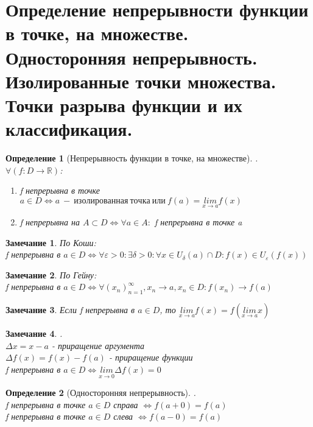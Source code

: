 \documentclass[11pt,a4paper,titlepage]{article}
\newtheorem*{definition}{Определение}
\newtheorem*{remark}{Замечание}
\renewcommand{\lim}[2]{\underset{#1 \rightarrow #2}{lim}}
\renewcommand{\iff}{\Leftrightarrow}
\renewcommand{\epsilon}{\varepsilon}
\newcommand{\R}{\mathbb{R}}
\begin{document}
    \section{Определение непрерывности функции в точке, на множестве. Односторонняя непрерывность. Изолированные точки множества. Точки разрыва функции и их классификация.}

    \begin{definition}[Непрерывность функции в точке, на множестве]
        .\\
        $\forall (f: D \to \R)$:
        \begin{enumerate}
            \item f непрерывна в точке $a \in D \iff a\ -\ изолированная\ точка\ или\ f(a) = \lim{x}{a}f(x)$
            \item f непрерывна на $A \subset D \iff \forall a\in A:$ f непрерывна в точке a
        \end{enumerate}
    \end{definition}

    \begin{remark}
        По Коши:\\
        f непрерывна в $a \in D \iff \forall \epsilon > 0: \exists \delta > 0: \forall x \in U_\delta(a) \cap D: f(x) \in U_\epsilon(f(x))$
    \end{remark}

    \begin{remark}
        По Гейну:\\
        f непрерывна в $a \in D \iff \forall (x_n)_{n=1}^\infty, x_n \to a, x_n \in D: f(x_n) \to f(a)$
    \end{remark}

    \begin{remark}
        Если f непрерывна в $a \in D$, то $\lim{x}{a}f(x) = f(\lim{x}{a}x)$
    \end{remark}

    \begin{remark}
        .\\
        $\Delta x = x - a$ - приращение аргумента\\
        $\Delta f(x) = f(x) - f(a)$ - приращение функции\\
        f непрерывна в $a \in D \iff \lim{x}{0}\Delta f(x) = 0$
    \end{remark}

    \begin{definition}[Односторонняя непрерывность]
        .\\
        f непрерывна в точке $a \in D$ справа $\iff f(a+0) = f(a)$\\
        f непрерывна в точке $a \in D$ слева $\iff f(a-0) = f(a)$\\
    \end{definition}
\end{document}
